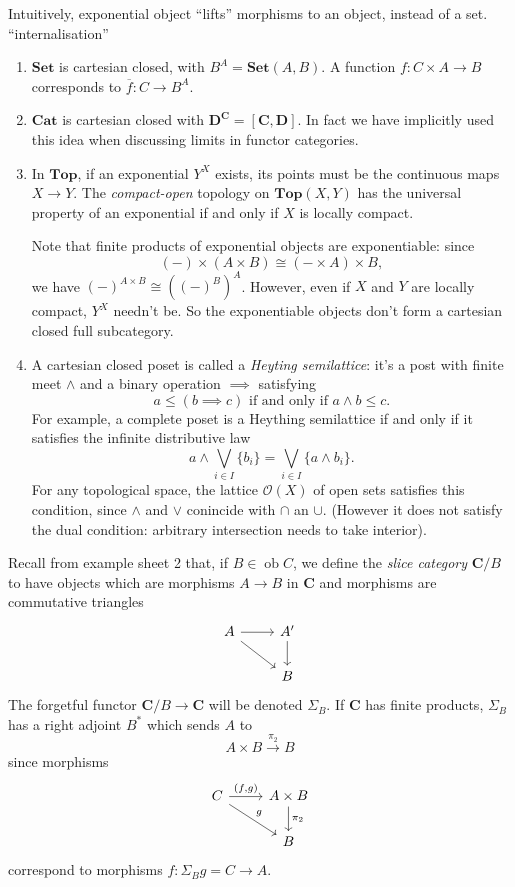 \documentclass[a4paper]{article}
\renewcommand{\c}[1]{\mathbf{#1}}
\DeclareMathOperator{\ob}{ob}
\newcommand{\Set}{{\c{Set}}}
\newcommand{\Top}{{\c{Top}}}
\begin{document}
Intuitively, exponential object ``lifts'' morphisms to an object, instead of a set. ``internalisation''

\begin{eg}\leavevmode
  \begin{enumerate}
  \item \(\Set\) is cartesian closed, with \(B^A = \Set(A, B)\). A function \(f: C \times A \to B\) corresponds to \(\overline f: C \to B^A\).
  \item \(\c{Cat}\) is cartesian closed with \(\c D^{\c C} = [\c C, \c D]\). In fact we have implicitly used this idea when discussing limits in functor categories.
  \item In \(\Top\), if an exponential \(Y^X\) exists, its points must be the continuous maps \(X \to Y\). The \emph{compact-open} topology on \(\c{Top}(X, Y)\) has the universal property of an exponential if and only if \(X\) is locally compact.

    Note that finite products of exponential objects are exponentiable: since
    \[
      (-) \times (A \times B) \cong (- \times A) \times B,
    \]
    we have \((-)^{A \times B} \cong ((-)^B)^A\). However, even if \(X\) and \(Y\) are locally compact, \(Y^X\) needn't be. So the exponentiable objects don't form a cartesian closed full subcategory.
  \item A cartesian closed poset is called a \emph{Heyting semilattice}: it's a post with finite meet \(\wedge\) and a binary operation \(\implies\) satisfying
    \[
      a \leq (b \implies c) \text{ if and only if } a \wedge b \leq c.
    \]
    For example, a complete poset is a Heything semilattice if and only if it satisfies the infinite distributive law
    \[
      a \wedge \bigvee_{i \in I} \{b_i\} = \bigvee_{i \in I} \{a \wedge b_i\}.
    \]
    For any topological space, the lattice \(\mathcal O(X)\) of open sets satisfies this condition, since \(\wedge\) and \(\vee\) conincide with \(\cap\) an \(\cup\). (However it does not satisfy the dual condition: arbitrary intersection needs to take interior).
  \end{enumerate}
\end{eg}

Recall from example sheet 2 that, if \(B \in \ob C\), we define the \emph{slice category} \(\c C /B\) to have objects which are morphisms \(A \to B\) in \(\c C\) and morphisms are commutative triangles
\[
  \begin{tikzcd}
    A \ar[r] \ar[dr] & A' \ar[d] \\
    & B
  \end{tikzcd}
\]
The forgetful functor \(\c C/B \to \c C\) will be denoted \(\Sigma_B\). If \(\c C\) has finite products, \(\Sigma_B\) has a right adjoint \(B^*\) which sends \(A\) to
\[
  A \times B \xrightarrow{\pi_2} B
\]
since morphisms
\[
  \begin{tikzcd}
    C \ar[r, "{(f, g)}"] \ar[dr, "g"] & A \times B \ar[d, "\pi_2"] \\
    & B
  \end{tikzcd}
\]
correspond to morphisms \(f: \Sigma_Bg = C \to A\).
\end{document}
